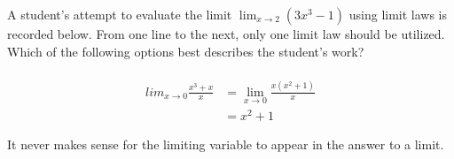 \documentclass{ximera}
\author{Steven Gubkin}
\begin{document}
\begin{exercise}

	A student's attempt to evaluate the limit $\lim_{x \to 2} \left( 3x^3-1 \right)$ using limit laws is recorded below.  From one line to the next, only one limit law should be utilized.  Which of the following options best describes the student's work?
	
	\begin{align*}
		\\lim_{x \to 0} \frac{x^3 + x}{x} &= \lim_{x \to 0} \frac{x(x^2+1)}{x}\\
		&= x^2+1
	\end{align*}
	
	\begin{multipleChoice}
	\end{multipleChoice}
	
	\begin{feedback}
		It never makes sense for the limiting variable to appear in the answer to a limit.
	\end{feedback}
	
\end{exercise}
\end{document}
